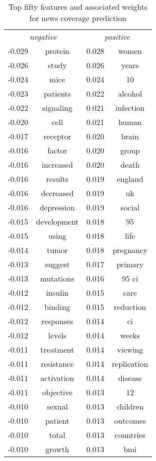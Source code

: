 \documentclass[paper=a4, fontsize=11pt]{scrartcl} %
\numberwithin{equation}{section} %
\numberwithin{figure}{section} %
\numberwithin{table}{section} %
\begin{document}
\begin{table}
\caption{Top fifty features and associated weights for news coverage prediction}
            \begin{tabular}{l c | l c}
            

        
\multicolumn{2}{c}{\emph{negative}} & \multicolumn{2}{c}{\emph{positive}} \\
-0.029 & protein & 0.028 & women \\
-0.026 & study & 0.026 & years \\
-0.024 & mice & 0.024 & 10 \\
-0.023 & patients & 0.022 & alcohol \\
-0.022 & signaling & 0.021 & infection \\
-0.020 & cell & 0.021 & human \\
-0.017 & receptor & 0.020 & brain \\
-0.016 & factor & 0.020 & group \\
-0.016 & increased & 0.020 & death \\
-0.016 & results & 0.019 & england \\
-0.016 & decreased & 0.019 & uk \\
-0.016 & depression & 0.019 & social \\
-0.015 & development & 0.018 & 95 \\
-0.015 & using & 0.018 & life \\
-0.014 & tumor & 0.018 & pregnancy \\
-0.013 & suggest & 0.017 & primary \\
-0.013 & mutations & 0.016 & 95 ci \\
-0.012 & insulin & 0.015 & care \\
-0.012 & binding & 0.015 & reduction \\
-0.012 & responses & 0.014 & ci \\
-0.012 & levels & 0.014 & weeks \\
-0.011 & treatment & 0.014 & viewing \\
-0.011 & resistance & 0.014 & replication \\
-0.011 & activation & 0.014 & disease \\
-0.011 & objective & 0.013 & 12 \\
-0.010 & sexual & 0.013 & children \\
-0.010 & patient & 0.013 & outcomes \\
-0.010 & total & 0.013 & countries \\
-0.010 & growth & 0.013 & bmi \\

\end{tabular}
\end{table}
\end{document}
